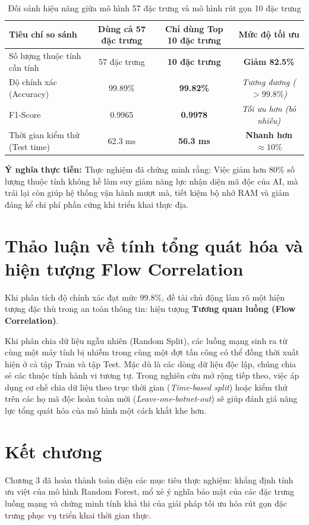 \documentclass[12pt,a4paper,oneside]{report}
\begin{document}
\begin{table}[h]
\centering
\caption{Đối sánh hiệu năng giữa mô hình 57 đặc trưng và mô hình rút gọn 10 đặc trưng}
\begin{tabular}{|l|c|c|c|}
\hline
\textbf{Tiêu chí so sánh} & \textbf{Dùng cả 57 đặc trưng} & \textbf{Chỉ dùng Top 10 đặc trưng} & \textbf{Mức độ tối ưu} \\ \hline
Số lượng thuộc tính cần tính & 57 đặc trưng & \textbf{10 đặc trưng} & \textbf{Giảm 82.5\%} \\ \hline
Độ chính xác (Accuracy) & 99.89\% & \textbf{99.82\%} & \textit{Tương đương ($>99.8\%$)} \\ \hline
F1-Score & 0.9965 & \textbf{0.9978} & \textit{Tối ưu hơn (bỏ nhiễu)} \\ \hline
Thời gian kiểm thử (Test time) & 62.3 ms & \textbf{56.3 ms} & \textbf{Nhanh hơn $\approx 10\%$} \\ \hline
\end{tabular}
\end{table}

\textbf{Ý nghĩa thực tiễn:} Thực nghiệm đã chứng minh rằng: Việc giảm hơn $80\%$ số lượng thuộc tính không hề làm suy giảm năng lực nhận diện mã độc của AI, mà trái lại còn giúp hệ thống vận hành mượt mà, tiết kiệm bộ nhớ RAM và giảm đáng kể chi phí phần cứng khi triển khai thực địa.

\section{Thảo luận về tính tổng quát hóa và hiện tượng Flow Correlation}
Khi phân tích độ chính xác đạt mức $99.8\%$, đề tài chủ động làm rõ một hiện tượng đặc thù trong an toàn thông tin: hiện tượng \textbf{Tương quan luồng (Flow Correlation)}.

Khi phân chia dữ liệu ngẫu nhiên (Random Split), các luồng mạng sinh ra từ cùng một máy tính bị nhiễm trong cùng một đợt tấn công có thể đồng thời xuất hiện ở cả tập Train và tập Test. Mặc dù là các dòng dữ liệu độc lập, chúng chia sẻ các thuộc tính hành vi tương tự. Trong nghiên cứu mở rộng tiếp theo, việc áp dụng cơ chế chia dữ liệu theo trục thời gian (\textit{Time-based split}) hoặc kiểm thử trên các họ mã độc hoàn toàn mới (\textit{Leave-one-botnet-out}) sẽ giúp đánh giá năng lực tổng quát hóa của mô hình một cách khắt khe hơn.

\section{Kết chương}
Chương 3 đã hoàn thành toàn diện các mục tiêu thực nghiệm: khẳng định tính ưu việt của mô hình Random Forest, mổ xẻ ý nghĩa bảo mật của các đặc trưng luồng mạng và chứng minh tính khả thi của giải pháp tối ưu hóa rút gọn đặc trưng phục vụ triển khai thời gian thực.
\end{document}
